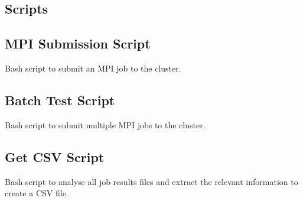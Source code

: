 \documentclass[12pt,oneside]{book} %
\begin{document}
\begin{subappendices}
    \section{Scripts}\label{appendix:scripts}
    \subsection{MPI Submission Script}
    Bash script to submit an MPI job to the cluster.
    

    \newpage
    \subsection{Batch Test Script}
    Bash script to submit multiple MPI jobs to the cluster.
    

    \newpage
    \subsection{Get CSV Script}
    Bash script to analyse all job results files and extract the relevant information to create a CSV file.
    
    

\end{subappendices}
\end{document}
